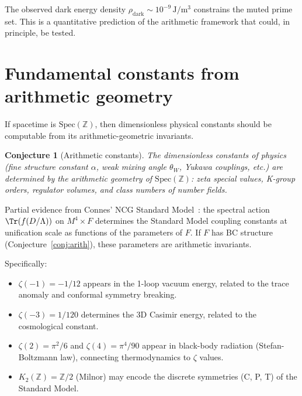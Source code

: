 \documentclass[11pt,a4paper]{article}
\newtheorem{conjecture}[theorem]{Conjecture}
\newcommand{\Spec}{\mathrm{Spec}}
\begin{document}
The observed dark energy density
$\rho_{\mathrm{dark}} \sim 10^{-9}\,\mathrm{J/m^3}$ constrains
the muted prime set. This is a quantitative prediction of the
arithmetic framework that could, in principle, be tested.

\section{Fundamental constants from arithmetic geometry}
\label{sec:constants}

If spacetime is $\Spec(\mathbb{Z})$, then dimensionless physical
constants should be computable from its arithmetic-geometric
invariants.

\begin{conjecture}[Arithmetic constants]
\label{conj:constants}
The dimensionless constants of physics (fine structure constant
$\alpha$, weak mixing angle $\theta_W$, Yukawa couplings, etc.)
are determined by the arithmetic geometry of $\Spec(\mathbb{Z})$:
zeta special values, K-group orders, regulator volumes, and
class numbers of number fields.
\end{conjecture}

Partial evidence from Connes' NCG Standard Model~\cite{CCM2007}:
the spectral action $\Tr(f(D/\Lambda))$ on $M^4 \times F$
determines the Standard Model coupling constants at unification
scale as functions of the parameters of $F$.
If $F$ has BC structure (Conjecture~\ref{conj:arith}), these
parameters are arithmetic invariants.

Specifically:
\begin{itemize}
\item $\zeta(-1) = -1/12$ appears in the 1-loop vacuum energy,
  related to the trace anomaly and conformal symmetry breaking.
\item $\zeta(-3) = 1/120$ determines the 3D Casimir energy,
  related to the cosmological constant.
\item $\zeta(2) = \pi^2/6$ and $\zeta(4) = \pi^4/90$ appear in
  black-body radiation (Stefan-Boltzmann law), connecting
  thermodynamics to $\zeta$ values.
\item $K_2(\mathbb{Z}) = \mathbb{Z}/2$ (Milnor) may encode
  the discrete symmetries (C, P, T) of the Standard Model.
\end{itemize}

\end{document}
